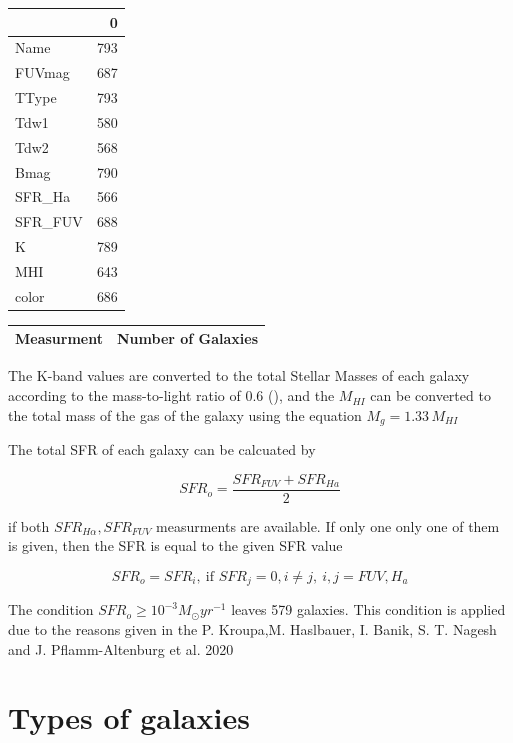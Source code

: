 \documentclass[a4paper,twocolumn]{article}
\begin{document}
\begin{table}[hc]
\centering
\begin{tabular}{lr}
\toprule
{} &    0 \\
\midrule
Name    &  793 \\
FUVmag  &  687 \\
TType   &  793 \\
Tdw1    &  580 \\
Tdw2    &  568 \\
Bmag    &  790 \\
SFR\_Ha  &  566 \\
SFR\_FUV &  688 \\
K       &  789 \\
MHI     &  643 \\
color   &  686 \\
\bottomrule
\end{tabular}
\end{table}

\begin{center}
\begin{tabular}{|l|l|}
\hline
Measurment & Number of Galaxies \\
\hline
\end{tabular}
\end{center}


The K-band values are converted to the total Stellar Masses of each galaxy according to the mass-to-light ratio of 0.6 (\cite{lelliSPARCMASSMODELS2016}), and the \(M_{HI}\) can be converted to the total mass of the gas of the galaxy using the equation \(M_g=1.33\,M_{HI}\)

The total SFR of each galaxy can be calcuated by

$$
    SFR_o=\frac{SFR_{FUV}+SFR_{Ha}}{2}
$$

if both \(SFR_{H\alpha},SFR_{FUV}\) measurments are available. If only one only one of them is given, then the SFR is equal to the given SFR value

$$
    SFR_o=SFR_i,\ \text{if } SFR_j=0,i\neq j,\ i,j=FUV, H_a
$$

The condition \(SFR_o\geq 10^{-3}M_\odot yr^{-1}\) leaves 579
galaxies. This condition is applied due to the reasons given in the P. Kroupa,M. Haslbauer, I. Banik, S. T. Nagesh and J. Pflamm-Altenburg et al. 2020 \cite{kroupaConstraintsStarFormation2020}

\section{Types of galaxies}
\label{sec:org9a48829}
\end{document}
